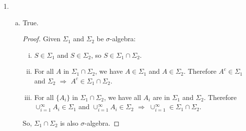 \documentclass[11pt]{article}
\begin{document}
\begin{enumerate}[1.]
\begin{enumerate}[(a)]
\begin{proof}
\begin{enumerate}[i.]
                So that $A \cup B \in \mathcal{C}$.
            \end{enumerate}
            Therefore $\mathcal{C}$ is an algebra, which ends the proof.
        \end{proof}
        
        \item
        $\sigma(\mathcal{A})$ is the Borel $\sigma$-algebra of $(0,1]$, denote it by $\mathcal{B}_{(0,1]}$.
        \begin{proof}
            For all $(x,y] \in \mathcal{A}$: If $y = 1$, $(x,1]$ is open in $(0,1]$, so $(x,1] \in \mathcal{B}_{(0,1]}$; 
            Else $(x,y] = \cap_{n=1}^\infty (x, y+\frac{1-y}{n})$.
            
            Therefore $(x,y] \in \mathcal{B}_{(0,1]} \Rightarrow \mathcal{A} \subset \mathcal{B}_{(0,1]} \Rightarrow \sigma(\mathcal{A}) \subset \mathcal{B}_{(0,1]}$

            On the other side, for all $A$ open interval relative to $(0,1]$: $A = (x,1] \in \mathcal{A}$ or $A = (x,y) = \cup_{n=1}^\infty (x,y-\frac{y-x}{n}] \in \sigma(\mathcal{A})$.
            Therefore $A \in \sigma(\mathcal{A}) \Rightarrow \mathcal{B}_{(0,1]} \subset \sigma(\mathcal{A})$.
            
            So $\sigma(\mathcal{A}) = \mathcal{B}_{(0,1]}$.
        \end{proof} 
    \end{enumerate}
    
    \item 
    \begin{enumerate}[(a)]
        \item
        True.
        \begin{proof}
            Given $\Sigma_1$ and $\Sigma_2$ be $\sigma$-algebra:
            \begin{enumerate}[i.]
                \item
                $S \in \Sigma_1$ and $S \in \Sigma_2$, so $S \in \Sigma_1 \cap \Sigma_2$.
                \item
                For all $A$ in $\Sigma_1 \cap \Sigma_2$, we have $A \in \Sigma_1$ and $A \in \Sigma_2$. 
                Therefore $A^c \in \Sigma_1$ and $\Sigma_2$ $\Rightarrow$ $A^c \in \Sigma_1 \cap \Sigma_2$.
                \item
                For all $\{A_i\}$ in $\Sigma_1 \cap \Sigma_2$, we have all $A_i$ are in $\Sigma_1$ and $\Sigma_2$. 
                Therefore $\cup_{i=1}^\infty A_i \in \Sigma_1$ and $\cup_{i=1}^\infty A_i \in \Sigma_2$ $\Rightarrow$ $\cup_{i=1}^\infty \in \Sigma_1 \cap \Sigma_2$.
            \end{enumerate}
            So, $\Sigma_1 \cap \Sigma_2$ is also $\sigma$-algebra.
        \end{proof}
        

\end{enumerate}
\end{enumerate}
\end{document}
